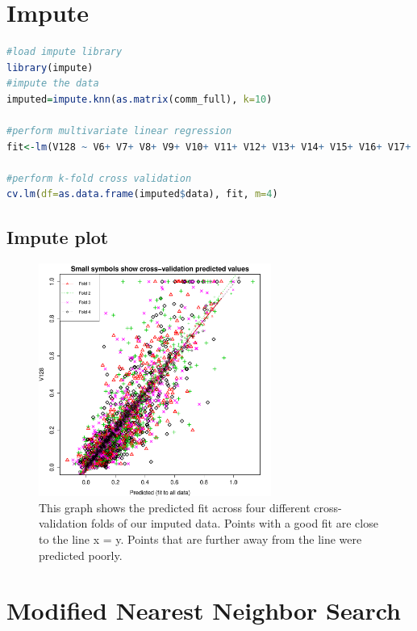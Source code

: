 \documentclass{article}
\begin{document}
\section{Impute}
\begin{lstlisting}[language=r]
#load impute library
library(impute)
#impute the data
imputed=impute.knn(as.matrix(comm_full), k=10)

#perform multivariate linear regression
fit<-lm(V128 ~ V6+ V7+ V8+ V9+ V10+ V11+ V12+ V13+ V14+ V15+ V16+ V17+ V18+ V19+ V20+ V21+ V22+ V23+ V24+ V25+ V26+ V27+ V28+ V29+ V30+ V32+ V33+ V34+ V35+ V36+ V37+ V38+ V39+ V40+ V41+ V42+ V43+ V44+ V45+ V46+ V47+ V48+ V49+ V50+ V51+ V52+ V53+ V54+ V55+ V56+ V57+ V58+ V59+ V60+ V61+ V62+ V63+ V64+ V65+ V66+ V67+ V68+ V69+ V70+ V71+ V72+ V73+ V74+ V75+ V76+ V77+ V78+ V79+ V80+ V81+ V82+ V83+ V84+ V85+ V86+ V87+ V88+ V89+ V90+ V91+ V92+ V93+ V94+ V95+ V96+ V97+ V98+ V99+ V100+ V101+ V119+ V120+ V121+ V126, data=as.data.frame(imputed$data))

#perform k-fold cross validation
cv.lm(df=as.data.frame(imputed$data), fit, m=4)
\end{lstlisting}

\subsection{Impute plot}
\begin{figure}[H]
\centering
\includegraphics[width=3.0in]{impute.pdf}
\caption{This graph shows the predicted fit across four different cross-validation folds of our imputed data. Points with a good fit are close to the line x = y. Points that are further away from the line were predicted poorly.}\label{fig_container} 
\end{figure}

\section{Modified Nearest Neighbor Search}
\end{document}
